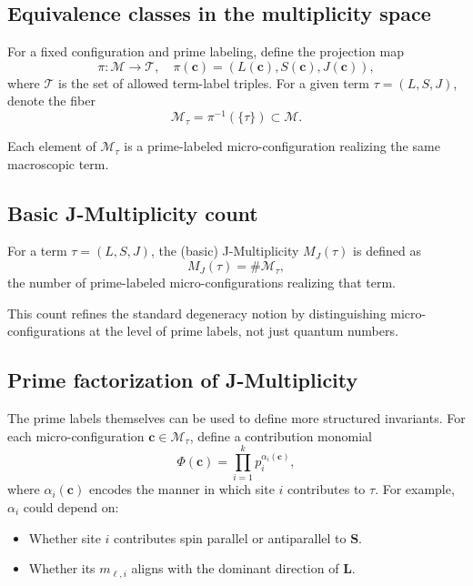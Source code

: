 \documentclass[11pt]{article}
\begin{document}
\subsection{Equivalence classes in the multiplicity space}

For a fixed configuration and prime labeling, define the projection map
\[
\pi : \mathcal{M} \to \mathcal{T},\quad
\pi(\mathbf{c}) = (L(\mathbf{c}), S(\mathbf{c}), J(\mathbf{c})),
\]
where \(\mathcal{T}\) is the set of allowed term-label triples. For a given term \(\tau = (L,S,J)\), denote the fiber
\[
\mathcal{M}_\tau = \pi^{-1}(\{\tau\}) \subset \mathcal{M}.
\]

Each element of \(\mathcal{M}_\tau\) is a prime-labeled micro-configuration realizing the same macroscopic term.

\subsection{Basic J-Multiplicity count}

\begin{definition}
For a term \(\tau = (L,S,J)\), the (basic) J-Multiplicity \(M_J(\tau)\) is defined as
\[
M_J(\tau) = \# \mathcal{M}_\tau,
\]
the number of prime-labeled micro-configurations realizing that term.
\end{definition}

This count refines the standard degeneracy notion by distinguishing micro-configurations at the level of prime labels, not just quantum numbers.

\subsection{Prime factorization of J-Multiplicity}

The prime labels themselves can be used to define more structured invariants. For each micro-configuration \(\mathbf{c} \in \mathcal{M}_\tau\), define a contribution monomial
\[
\Phi(\mathbf{c}) = \prod_{i=1}^k p_i^{\alpha_i(\mathbf{c})},
\]
where \(\alpha_i(\mathbf{c})\) encodes the manner in which site \(i\) contributes to \(\tau\). For example, \(\alpha_i\) could depend on:
\begin{itemize}
  \item Whether site \(i\) contributes spin parallel or antiparallel to \(\mathbf{S}\).
  \item Whether its \(m_{\ell,i}\) aligns with the dominant direction of \(\mathbf{L}\).
\end{itemize}
\end{document}
